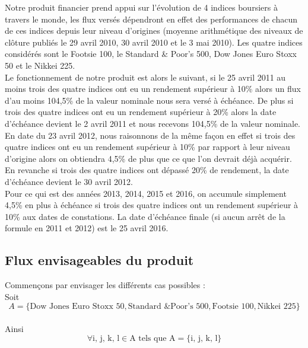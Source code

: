 \documentclass[french,12pt,a4paper]{article}
\begin{document}
Notre produit financier prend appui sur l'évolution de 4 indices boursiers à travers le monde, les flux versés dépendront en effet des performances de chacun de ces indices depuis leur niveau d'origines (moyenne arithmétique des niveaux de clôture publiés le 29 avril 2010, 30 avril 2010 et le 3 mai 2010).
Les quatre indices considérés sont le Footsie 100, le Standard \& Poor's 500, Dow Jones Euro Stoxx 50 et le Nikkei 225.\\
\indent Le fonctionnement de notre produit est alors le suivant, si le 25 avril 2011 au moins trois des quatre indices ont eu un rendement supérieur à 10\%  alors un flux d'au moins 104,5\% de la valeur nominale nous sera versé à échéance. De plus si trois des quatre indices ont eu un rendement supérieur à 20\% alors la date d'échéance devient le 2 avril 2011 et nous recevons 104,5\% de la valeur nominale.\\
\indent En date du 23 avril 2012, nous raisonnons de la même façon en effet si trois des quatre indices ont eu un rendement supérieur à 10\% par rapport à leur niveau d'origine alors on obtiendra 4,5\% de plus que ce que l'on devrait déjà acquérir. En revanche si trois des quatre indices ont dépassé 20\% de rendement, la date d'échéance devient le 30 avril 2012.\\
Pour ce qui est des années 2013, 2014, 2015 et 2016, on accumule simplement 4,5\% en plus à échéance si trois des quatre indices ont un rendement supérieur à 10\% aux dates de constations. La date d'échéance finale (si aucun arrêt de la formule en 2011 et 2012) est le 25 avril 2016.\\

\subsection{Flux envisageables du produit}

\noindent Commençons par envisager les différents cas possibles :\\
Soit 
\[ A = \{ \text{Dow Jones Euro Stoxx 50}, \text{Standard \& Poor's 500}, \text{Footsie 100}, \text{Nikkei 225} \} \]\\
Ainsi 
\[ \forall \text{i, j, k, l} \in \text{A tels que A} = \{ \text{i, j, k, l} \} \]\\
\end{document}
